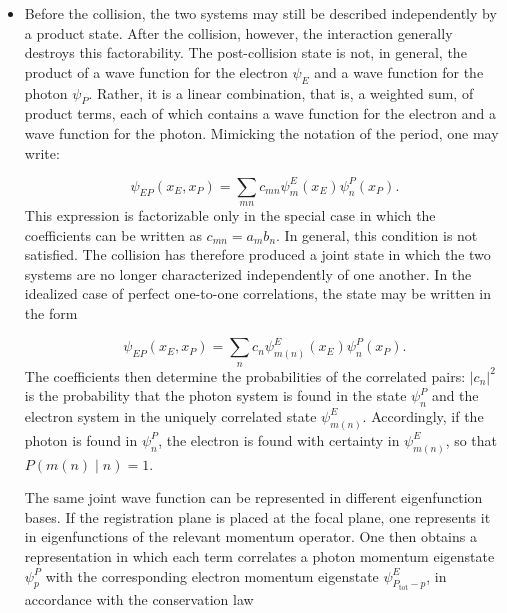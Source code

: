 \documentclass[final,12pt]{article}
\begin{document}
\begin{itemize}
\item Before the collision, the two systems may still be described independently by a product state. After the collision, however, the interaction generally destroys this factorability. The post-collision state is not, in general, the product of a wave function for the electron $\psi_E$ and a wave function for the photon $\psi_P$. Rather, it is a linear combination, that is, a weighted sum, of product terms, each of which contains a wave function for the electron and a wave function for the photon. Mimicking the notation of the period, one may write:

\begin{equation*}
\psi_{EP}(x_E,x_P)
=
\sum_{mn} c_{mn}\psi^E_m(x_E)\psi^P_n(x_P).
\end{equation*}
%
This expression is factorizable only in the special case in which the coefficients can be written as $c_{mn}=a_m b_n$. In general, this condition is not satisfied. The collision has therefore produced a joint state in which the two systems are no longer characterized independently of one another. In the idealized case of perfect one-to-one correlations, the state may be written in the form

\begin{equation*}
\psi_{EP}(x_E,x_P)
=
\sum_n c_n\psi^E_{m(n)}(x_E)\psi^P_n(x_P).
\end{equation*}
%
The coefficients then determine the probabilities of the correlated pairs: $\left|c_n\right|^2$ is the probability that the photon system is found in the state $\psi^P_n$ and the electron system in the uniquely correlated state $\psi^E_{m(n)}$. Accordingly, if the photon is found in $\psi^P_n$, the electron is found with certainty in $\psi^E_{m(n)}$, so that $P(m(n)\mid n)=1$.


The same joint wave function can be represented in different eigenfunction bases. If the registration plane is placed at the focal plane, one represents it in eigenfunctions of the relevant momentum operator. One then obtains a representation in which each term correlates a photon momentum eigenstate $\psi^P_p$ with the corresponding electron momentum eigenstate $\psi^E_{P_{\mathrm{tot}}-p}$, in accordance with the conservation law


\end{itemize}
\end{document}
